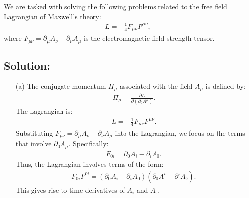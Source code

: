 We are tasked with solving the following problems related to the free field Lagrangian of Maxwell’s theory:
\begin{align}
    L = -\frac{1}{4} F_{\mu\nu} F^{\mu\nu},
\end{align}
where $F_{\mu\nu} = \partial_\mu A_\nu - \partial_\nu A_\mu$ is the electromagnetic field strength tensor.
\bigskip\bigskip\hline\hline\bigskip
\subsection*{Solution:}
\begin{enumerate}
    \item [(a)] The conjugate momentum $\Pi_\mu$ associated with the field $A_\mu$ is defined by:
\begin{align}
    \Pi_\mu = \frac{\partial L}{\partial (\partial_0 A^\mu)}.
\end{align}
The Lagrangian is:
\begin{align*}
    L = -\frac{1}{4} F_{\mu\nu} F^{\mu\nu}.
\end{align*}
Substituting $F_{\mu\nu} = \partial_\mu A_\nu - \partial_\nu A_\mu$ into the Lagrangian, we focus on the terms that involve $\partial_0 A_\mu$. Specifically:
\begin{align*}
    F_{0i} = \partial_0 A_i - \partial_i A_0.
\end{align*}
Thus, the Lagrangian involves terms of the form:
\begin{align*}
    F_{0i} F^{0i} = (\partial_0 A_i - \partial_i A_0)(\partial_0 A^i - \partial^i A_0).
\end{align*}
This gives rise to time derivatives of $A_i$ and $A_0$.


\end{enumerate}
